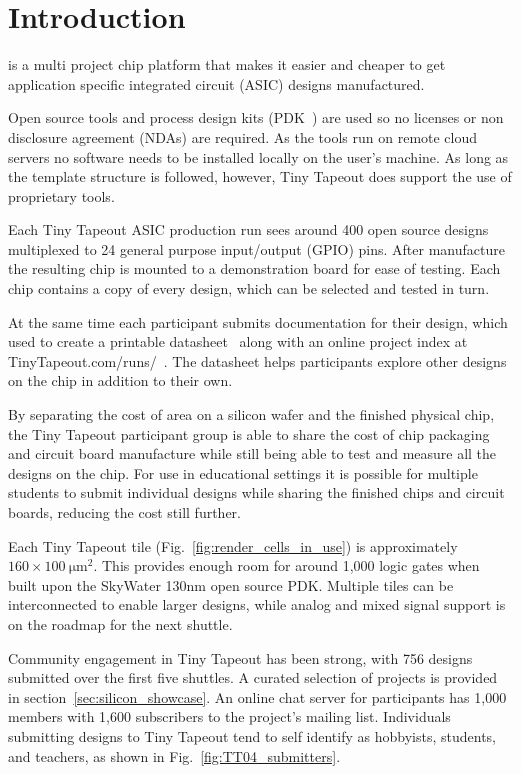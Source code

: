 \section{Introduction}
\label{sec:introduction}
 is a multi project chip platform that makes it easier and cheaper to get application specific integrated circuit (ASIC) designs manufactured.

Open source tools and process design kits (PDK~\cite{pdk}) are used so no licenses or non disclosure agreement (NDAs) are required. As the tools run on remote cloud servers no software needs to be installed locally on the user's machine. As long as the template structure is followed, however, Tiny Tapeout does support the use of proprietary tools.

Each Tiny Tapeout ASIC production run sees around 400 open source designs multiplexed to 24 general purpose input/output (GPIO) pins. After manufacture the resulting chip is mounted to a demonstration board for ease of testing. Each chip contains a copy of every design, which can be selected and tested in turn.

At the same time each participant submits documentation for their design, which used to create a printable datasheet~\cite{datasheet} along with an online project index at TinyTapeout.com/runs/~\cite{tinytapeoutruns}. The datasheet helps participants explore other designs on the chip in addition to their own.

By separating the cost of area on a silicon wafer and the finished physical chip, the Tiny Tapeout participant group is able to share the cost of chip packaging and circuit board manufacture while still being able to test and measure all the designs on the chip. For use in educational settings it is possible for multiple students to submit individual designs while sharing the finished chips and circuit boards, reducing the cost still further.

Each Tiny Tapeout tile (Fig.~\ref{fig:render_cells_in_use}) is approximately $160 \times \qty{100}{\micro\meter\squared}$. This provides enough room for around 1,000 logic gates when built upon the SkyWater 130nm open source PDK. Multiple tiles can be interconnected to enable larger designs, while analog and mixed signal support is on the roadmap for the next shuttle.

Community engagement in Tiny Tapeout has been strong, with 756 designs submitted over the first five shuttles. A curated selection of projects is provided in section~\ref{sec:silicon_showcase}.
An online chat server for participants has 1,000 members with 1,600 subscribers to the project's mailing list. Individuals submitting designs to Tiny Tapeout tend to self identify as hobbyists, students, and teachers, as shown in Fig.~\ref{fig:TT04_submitters}.

